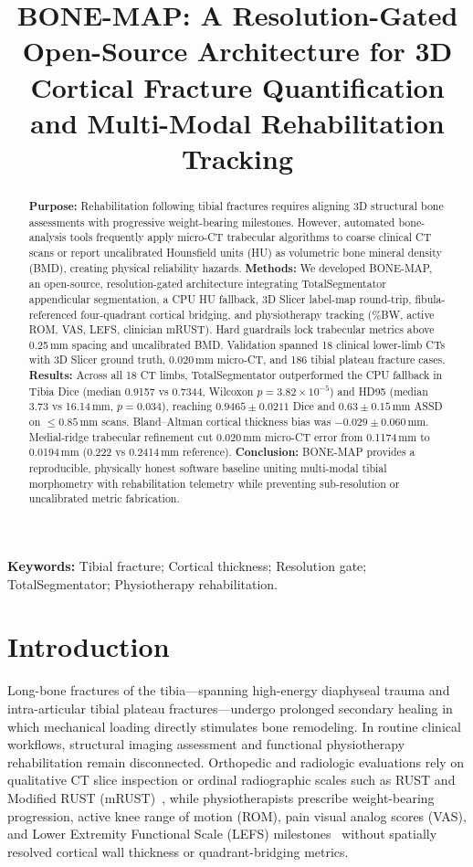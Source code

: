 \documentclass[11pt]{article}
\title{BONE-MAP: A Resolution-Gated Open-Source Architecture for 3D Cortical Fracture Quantification and Multi-Modal Rehabilitation Tracking}
\date{}
\begin{document}
\maketitle

\begin{abstract}
\textbf{Purpose:} Rehabilitation following tibial fractures requires aligning 3D structural bone assessments with progressive weight-bearing milestones. However, automated bone-analysis tools frequently apply micro-CT trabecular algorithms to coarse clinical CT scans or report uncalibrated Hounsfield units (HU) as volumetric bone mineral density (BMD), creating physical reliability hazards.
\textbf{Methods:} We developed BONE-MAP, an open-source, resolution-gated architecture integrating TotalSegmentator appendicular segmentation, a CPU HU fallback, 3D Slicer label-map round-trip, fibula-referenced four-quadrant cortical bridging, and physiotherapy tracking (\%BW, active ROM, VAS, LEFS, clinician mRUST). Hard guardrails lock trabecular metrics above 0.25\,mm spacing and uncalibrated BMD. Validation spanned 18 clinical lower-limb CTs with 3D Slicer ground truth, 0.020\,mm micro-CT, and 186 tibial plateau fracture cases.
\textbf{Results:} Across all 18 CT limbs, TotalSegmentator outperformed the CPU fallback in Tibia Dice (median 0.9157 vs 0.7344, Wilcoxon $p=3.82\times 10^{-5}$) and HD95 (median 3.73 vs 16.14\,mm, $p=0.034$), reaching $0.9465\pm 0.0211$ Dice and $0.63\pm 0.15$\,mm ASSD on $\le 0.85$\,mm scans. Bland--Altman cortical thickness bias was $-0.029\pm 0.060$\,mm. Medial-ridge trabecular refinement cut 0.020\,mm micro-CT error from 0.1174\,mm to 0.0194\,mm (0.222 vs 0.2414\,mm reference).
\textbf{Conclusion:} BONE-MAP provides a reproducible, physically honest software baseline uniting multi-modal tibial morphometry with rehabilitation telemetry while preventing sub-resolution or uncalibrated metric fabrication.
\end{abstract}

\noindent\textbf{Keywords:} Tibial fracture; Cortical thickness; Resolution gate; TotalSegmentator; Physiotherapy rehabilitation.

\section{Introduction}
Long-bone fractures of the tibia---spanning high-energy diaphyseal trauma and intra-articular tibial plateau fractures---undergo prolonged secondary healing in which mechanical loading directly stimulates bone remodeling. In routine clinical workflows, structural imaging assessment and functional physiotherapy rehabilitation remain disconnected. Orthopedic and radiologic evaluations rely on qualitative CT slice inspection or ordinal radiographic scales such as RUST and Modified RUST (mRUST)~\cite{whelan2010rust,litrenta2015mrust}, while physiotherapists prescribe weight-bearing progression, active knee range of motion (ROM), pain visual analog scores (VAS), and Lower Extremity Functional Scale (LEFS) milestones~\cite{binkley1999lefs} without spatially resolved cortical wall thickness or quadrant-bridging metrics.
\end{document}
